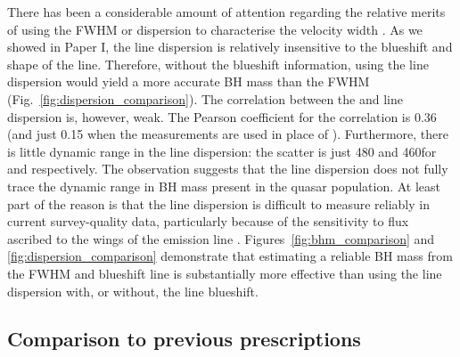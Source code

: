 There has been a considerable amount of attention regarding the relative merits of using the FWHM or dispersion to characterise the velocity width \citep[e.g.][]{denney13}.
As we showed in Paper I, the line dispersion is relatively insensitive to the blueshift and shape of the  line. 
Therefore, without the blueshift information, using the line dispersion would yield a more accurate BH mass than the FWHM (Fig.~\ref{fig:dispersion_comparison}). 
The correlation between the \ha and  line dispersion is, however, weak. 
The Pearson coefficient for the correlation is 0.36 (and just 0.15 when the \hb measurements are used in place of \hans). 
Furthermore, there is little dynamic range in the line dispersion: the scatter is just 480 and 460\kms for \ha and  respectively. The observation suggests that the line dispersion does not fully trace the dynamic range in BH mass present in the quasar population. 
At least part of the reason is that the line dispersion is difficult to measure reliably in current survey-quality data, particularly because of the sensitivity to flux ascribed to the wings of the emission line \citep[e.g.][]{mejia-restrepo16}. 
Figures~\ref{fig:bhm_comparison} and \ref{fig:dispersion_comparison} demonstrate that estimating a reliable BH mass from the  FWHM and blueshift line is substantially more effective than using the  line dispersion with, or without, the line blueshift. 


\subsection{Comparison to previous prescriptions}

